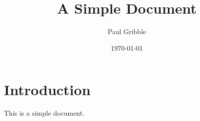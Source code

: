 \documentclass[11pt,letterpaper]{article}
\author{Paul Gribble}
\date{\today}
\title{A Simple Document}
\begin{document}
\maketitle

\section{Introduction}

This is a simple document.
\end{document}
